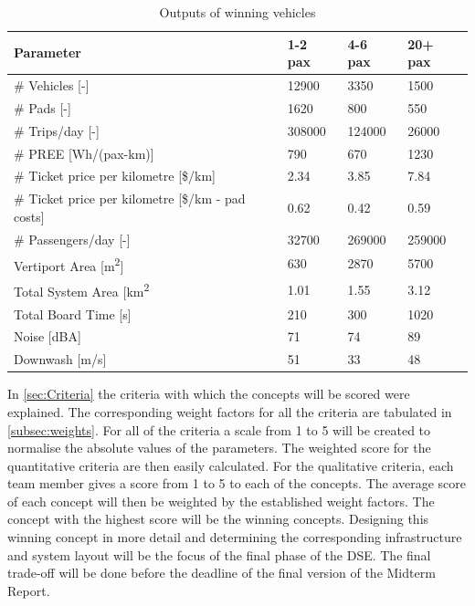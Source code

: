 \begin{table}[H]
\captionsetup{justification=centering}
\caption{Outputs of winning vehicles}
\label{outputswin}
\begin{tabular}{llll}
\hline
\textbf{Parameter}                          & \textbf{1-2 pax} & \textbf{4-6 pax} & \textbf{20+ pax} \\ \hline
\# Vehicles {[}-{]}                         & 12900             &     3350             & 1500             \\
\# Pads {[}-{]}                             & 1620             &        800          & 550              \\
\# Trips/day {[}-{]}                        & 308000           &       124000           & 26000            \\
\# PREE {[}Wh/(pax-km){]}                   & 790           &        670          & 1230           \\
\# Ticket price per kilometre {[}\$/km{]} & 2.34             &    3.85              & 7.84             \\
\# Ticket price per kilometre {[}\$/km - pad costs{]} & 0.62             &    0.42              & 0.59             \\
\# Passengers/day {[}-{]}                   & 32700           &     269000             & 259000           \\
Vertiport Area {[}m\textsuperscript{2}{]}   & 630            &     2870             & 5700             \\
Total System Area {[}km\textsuperscript{2}  & 1.01          &       1.55           & 3.12          \\
Total Board Time {[}s{]}                    & 210              &        300          & 1020             \\
Noise {[}dBA{]}                             & 71             &       74           & 89             \\ 
Downwash [m/s]                              & 51            &       33              &   48      \\ \hline
\end{tabular}
\end{table}

In \autoref{sec:Criteria} the criteria with which the concepts will be scored were explained. The corresponding weight factors for all the criteria are tabulated in \autoref{subsec:weights}. For all of the criteria a scale from 1 to 5 will be created to normalise the absolute values of the parameters. The weighted score for the quantitative criteria are then easily calculated. For the qualitative criteria, each team member gives a score from 1 to 5 to each of the concepts. The average score of each concept will then be weighted by the established weight factors. The concept with the highest score will be the winning concepts. Designing this winning concept in more detail and determining the corresponding infrastructure and system layout will be the focus of the final phase of the DSE. The final trade-off will be done before the deadline of the final version of the Midterm Report. 

